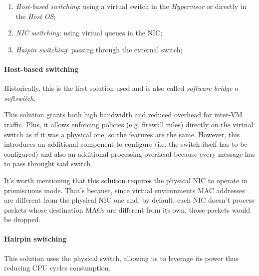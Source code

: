 \noindent
\begin{minipage}{0.48\textwidth}
\begin{enumerate}
    \item \emph{Host-based switching}: using a virtual switch in the
    \emph{Hypervisor} or directly in the \emph{Host OS};
    \item \emph{NIC switching}: using virtual queues in the NIC;
    \item \emph{Haipin switching}: passing through the external switch;
\end{enumerate}
\end{minipage}
\hfill
\begin{minipage}{0.48\textwidth}
    \centering
\end{minipage}

\paragraph{Host-based switching}
Historically, this is the first solution used and is also called \emph{software
bridge} o \emph{softswitch}.

\bigskip\noindent
\begin{minipage}{0.48\textwidth}
    This solution grants both high bandwidth and reduced overhead for inter-VM
    traffic. Plus, it allows enforcing policies (e.g. firewall rules) directly
    on the virtual switch as if it was a physical one, so the features are the
    same. However, this introduces an additional component to configure (i.e. the
    switch itself has to be configured) and also an additional processing
    overhead because every message has to pass throught said switch.
\end{minipage}
\hfill
\begin{minipage}{0.48\textwidth}
    \centering
\end{minipage}

\bigskip\noindent
It's worth mentioning that this solution requires the physical NIC to operate in
promiscuous mode. That's because, since virtual environments MAC addresses are
different from the physical NIC one and, by default, each NIC doesn't process
packets whose destination MACs are different from its own, those packets would
be dropped.

\paragraph{Hairpin switching}
This solution uses the physical switch, allowing us to leverage its power thus
reducing CPU cycles consumption.


